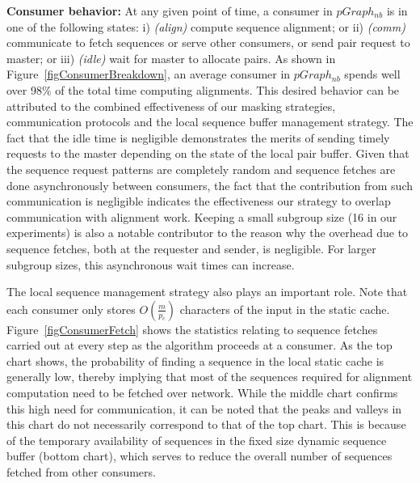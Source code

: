 \documentclass[10pt,journal,letterpaper,compsoc]{IEEEtran}
\begin{document}
{\bf Consumer behavior: } At any given point of time, a consumer in $pGraph_{nb}$ is in one of the following states: i) \emph{(align)} compute sequence alignment; or ii) \emph{(comm)} communicate to fetch sequences or serve other consumers, or send pair request to master; or iii) \emph{(idle)} wait for master to allocate pairs. As shown in Figure~\ref{figConsumerBreakdown}, an average consumer in $pGraph_{nb}$ spends well over 98\% of the total time computing alignments. This desired behavior can be attributed to the combined effectiveness of our masking strategies, communication protocols and the local sequence buffer management strategy. The fact that the idle time is negligible demonstrates the merits of sending timely requests to the master depending on the state of the local pair buffer. Given that the sequence request patterns are completely random and sequence fetches are done asynchronously between consumers, the fact that the contribution from such communication is negligible indicates the effectiveness our strategy to overlap communication with alignment work. Keeping a small subgroup size (16 in our experiments) is also a notable contributor to the reason why the overhead due to sequence fetches, both at the requester and sender, is negligible. For larger subgroup sizes, this asynchronous wait times can increase.

The local sequence management strategy also plays an important role. Note that each consumer only stores $O(\frac{m}{p_c})$ characters of the input in the static cache. Figure~\ref{figConsumerFetch} shows the statistics relating to sequence fetches carried out at every step as the algorithm proceeds at a consumer. As the top chart shows, the probability of finding a sequence in the local static cache is generally low, thereby implying that most of the sequences required for alignment computation need to be fetched over network. While the middle chart confirms this high need for communication, it can be noted that the peaks and valleys in this chart do not necessarily correspond to that of the top chart. This is because of the temporary availability of sequences in the fixed size dynamic sequence buffer (bottom chart), which serves to reduce the overall number of sequences fetched from other consumers.
 
\end{document}
